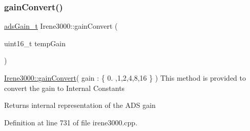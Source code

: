 \subsubsection{\texorpdfstring{gain\+Convert()}{gainConvert()}}
{\footnotesize\ttfamily \hyperlink{_cool_adafruit___a_d_s1015_8h_a3d6c0e15829a207b9155890811fa4781}{ads\+Gain\+\_\+t} Irene3000\+::gain\+Convert (\begin{DoxyParamCaption}\item[{uint16\+\_\+t}]{temp\+Gain }\end{DoxyParamCaption})}

\hyperlink{class_irene3000_abcad62d1201a59f8dd3ba87048002728}{Irene3000\+::gain\+Convert}( gain \+: \{ 0. ,1,2,4,8,16 \} ) This method is provided to convert the gain to Internal Constants

\begin{DoxyReturn}{Returns}
internal representation of the A\+DS gain 
\end{DoxyReturn}


Definition at line 731 of file irene3000.\+cpp.


